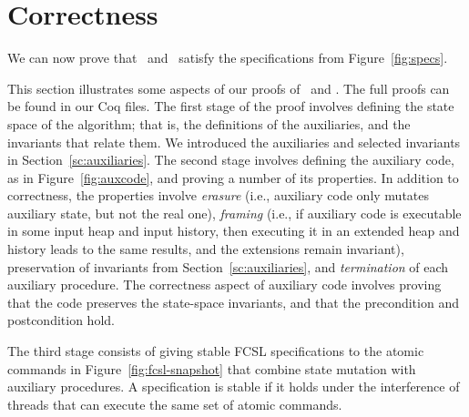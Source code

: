 \section{Correctness}
\label{sc:proof}

We can now prove that \jywrite\ and \jyscan\ satisfy the
specifications from Figure~\ref{fig:specs}.



This section illustrates some aspects of our proofs of \jywrite\ and
\jyscan. The full proofs can be found in our Coq files.
The first stage of the proof involves defining the state space of the
algorithm; that is, the definitions of the auxiliaries, and the
invariants that relate them. We introduced the auxiliaries and
selected invariants in Section~\ref{sc:auxiliaries}. 
The second stage involves defining the auxiliary code, as in
Figure~\ref{fig:auxcode}, and proving a number of its properties. In
addition to correctness, the properties involve \emph{erasure} (i.e.,
auxiliary code only mutates auxiliary state, but not the real one),
\emph{framing} (i.e., if auxiliary code is executable in some input
heap and input history, then executing it in an extended heap and
history leads to the same results, and the extensions remain
invariant), preservation of invariants from
Section~\ref{sc:auxiliaries}, and \emph{termination} of each auxiliary
procedure. The correctness aspect of auxiliary code involves proving
that the code preserves the state-space invariants, and that the
precondition and postcondition hold.


The third stage consists of giving stable FCSL specifications to the
atomic commands in Figure~\ref{fig:fcsl-snapshot} that combine state
mutation with auxiliary procedures. A specification is stable if it
holds under the interference of threads that can execute the same set
of atomic commands.

